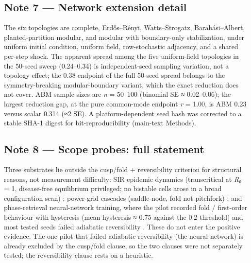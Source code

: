 \documentclass[11pt,letterpaper]{article}
\begin{document}
\subsection{Note 7 --- Network extension detail}\label{note-7-network-extension-detail}

The six topologies are complete, Erdős--Rényi, Watts--Strogatz, Barabási--Albert, planted-partition modular, and modular with boundary-only stabilization, under uniform initial condition, uniform field, row-stochastic adjacency, and a shared per-step shock. The apparent spread among the five uniform-field topologies in the 50-seed sweep (0.24--0.34) is independent-seed sampling variation, not a topology effect; the 0.38 endpoint of the full 50-seed spread belongs to the symmetry-breaking modular-boundary variant, which the exact reduction does not cover. ABM sample sizes are \emph{n} = 50--100 (binomial SE ≈ 0.02--0.06); the largest reduction gap, at the pure common-mode endpoint \emph{r} = 1.00, is ABM 0.23 versus scalar 0.314 (≈2 SE). A platform-dependent seed hash was corrected to a stable SHA-1 digest for bit-reproducibility (main-text Methods).

\subsection{Note 8 --- Scope probes: full statement}\label{note-8-scope-probes-full-statement}

Three substrates lie outside the cusp/fold + reversibility criterion for structural reasons, not measurement difficulty: SIR epidemic dynamics (transcritical at \emph{R}₀ = 1, disease-free equilibrium privileged; no bistable cells arose in a broad configuration scan) \cite{vandendriessche2002,hadeler1997}; power-grid cascades (saddle-node, fold not pitchfork) \cite{schaefer2018,manik2017,witthaut2022}; and phase-retrieval neural-network training, where the pilot recorded fold / first-order behaviour with hysteresis (mean hysteresis ≈ 0.75 against the 0.2 threshold) and most tested seeds failed adiabatic reversibility \cite{mannelli2019,mondelli2019}. These do not enter the positive evidence. The one pilot that failed adiabatic reversibility (the neural network) is already excluded by the cusp/fold clause, so the two clauses were not separately tested; the reversibility clause rests on a heuristic.
\end{document}
